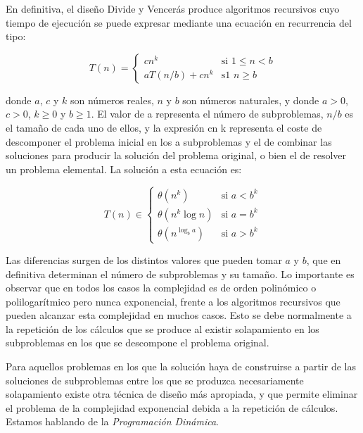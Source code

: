 En definitiva, el diseño Divide y Vencerás produce algoritmos recursivos cuyo
tiempo de ejecución  se puede expresar
mediante una ecuación en recurrencia del tipo:

$$
T(n) = 
\begin{cases}
	cn^k &\text{si  } 1 \le n < b  \\ 
	aT(n/b) + cn^k   &\text{s1  } n \ge b  
\end{cases}
$$

donde $a$, $c$ y $k$ son números reales, $n$ y $b$ son números naturales, y donde $a>0$, $c > 0$,
$k \ge 0$ y $b\ge1$. El valor de a representa el número de subproblemas, $n/b$ es el tamaño
de cada uno de ellos, y la expresión cn k representa el coste de descomponer el
problema inicial en los a subproblemas y el de combinar las soluciones para
producir la solución del problema original, o bien el de resolver un problema
elemental. La solución a esta ecuación es:

$$
T(n) \in
\begin{cases}
	\theta(n^k) &\text{si  }  a < b^k  \\ 
	\theta(n^k \log n) &\text{si  }  a = b^k  \\ 
	\theta(n^{\log_b a}) &\text{si  }  a > b^k 
\end{cases}
$$

Las diferencias surgen de los distintos valores que pueden tomar $a$ y $b$, que en
definitiva determinan el número de subproblemas y su tamaño. Lo importante es
observar que en todos los casos la complejidad es de orden polinómico o
polilogarítmico pero nunca exponencial, frente a los algoritmos recursivos que
pueden alcanzar esta complejidad en muchos casos. Esto se
debe normalmente a la repetición de los cálculos que se produce al existir
solapamiento en los subproblemas en los que se descompone el problema original.

Para aquellos problemas en los que la solución haya de construirse a partir de
las soluciones de subproblemas entre los que se produzca necesariamente
solapamiento existe otra técnica de diseño más apropiada, y que permite eliminar el
problema de la complejidad exponencial debida a la repetición de cálculos.
Estamos hablando de la \emph{Programación Dinámica}.